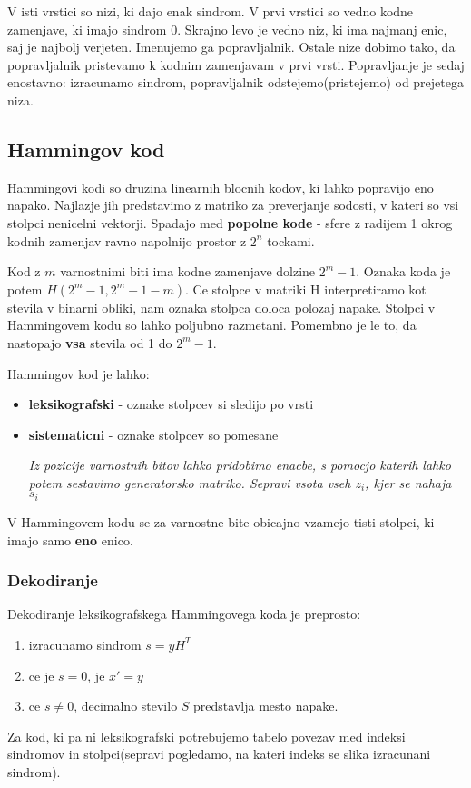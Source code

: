 \documentclass{article}
\begin{document}
\begin{multicols}{2}
	V isti vrstici so nizi, ki dajo enak sindrom. V prvi vrstici so vedno kodne zamenjave, ki
	imajo sindrom 0. Skrajno levo je vedno niz, ki ima najmanj enic, saj je najbolj verjeten.
	Imenujemo ga popravljalnik. Ostale nize dobimo tako, da popravljalnik pristevamo k kodnim
	zamenjavam v prvi vrsti. Popravljanje je sedaj enostavno: izracunamo sindrom, popravljalnik
	odstejemo(pristejemo) od prejetega niza.


	\subsection{Hammingov kod}
	Hammingovi kodi so druzina linearnih blocnih kodov, ki lahko popravijo eno napako.
	Najlazje jih predstavimo z matriko za preverjanje sodosti, v kateri so vsi stolpci
	nenicelni vektorji. Spadajo med \textbf{popolne kode} - sfere z radijem 1 okrog kodnih
	zamenjav ravno napolnijo prostor z $2^n$ tockami.

	Kod z $m$ varnostnimi biti ima kodne zamenjave dolzine $2^m - 1$.  Oznaka koda je potem
	$H(2^m - 1, 2^m - 1 - m)$. Ce stolpce v matriki H interpretiramo kot stevila v binarni
	obliki, nam oznaka stolpca doloca polozaj napake. Stolpci v Hammingovem kodu so lahko
	poljubno razmetani. Pomembno je le to, da nastopajo \textbf{vsa} stevila od 1 do $2^m - 1$.

	Hammingov kod je lahko:
	\begin{itemize}
		\item \textbf{leksikografski} - oznake stolpcev si sledijo po vrsti

		\item \textbf{sistematicni} - oznake stolpcev so pomesane

		      \textit{Iz pozicije varnostnih bitov lahko pridobimo enacbe, s pomocjo katerih
			      lahko potem sestavimo generatorsko matriko. Sepravi vsota vseh $z_i$, kjer se nahaja $s_i$}
	\end{itemize}

	V Hammingovem kodu se za varnostne bite obicajno vzamejo tisti stolpci, ki imajo samo \textbf{eno} enico.

	\subsubsection{Dekodiranje}
	Dekodiranje leksikografskega Hammingovega koda je preprosto:
	\begin{enumerate}
		\item izracunamo sindrom $s = yH^T$
		\item ce je $s = 0$, je $x' = y$
		\item ce $s \neq 0$, decimalno stevilo $S$ predstavlja mesto napake.
	\end{enumerate}
	Za kod, ki pa ni leksikografski potrebujemo tabelo povezav med indeksi sindromov in stolpci(sepravi pogledamo, na kateri indeks se slika izracunani sindrom).


\end{multicols}
\end{document}

